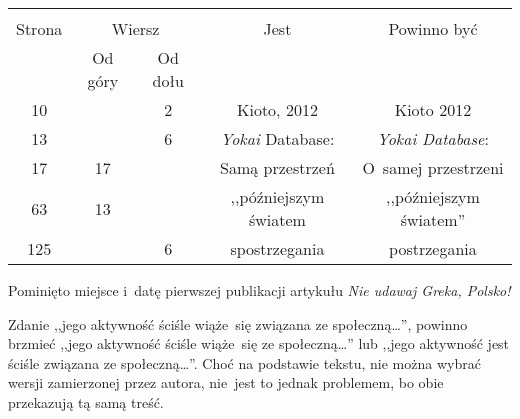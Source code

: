\documentclass[a4paper,11pt]{article}
\begin{document}
\begin{center}
  \begin{tabular}{|c|c|c|c|c|}
    \hline
    & \multicolumn{2}{c|}{} & & \\
    Strona & \multicolumn{2}{c|}{Wiersz} & Jest
                              & Powinno być \\ \cline{2-3}
    & Od góry & Od dołu & & \\
    \hline
    10  & &  2 & Kioto, 2012 & Kioto 2012 \\
    13  & &  6 & \emph{Yokai} Database: & \emph{Yokai Database}: \\
    17  & 17 & & Samą przestrzeń & O~samej przestrzeni \\
    63  & 13 & & ,,późniejszym światem & ,,późniejszym światem'' \\
    125 & &  6 & spostrzegania & postrzegania \\
    \hline
  \end{tabular}
\end{center}

\vspace{\spaceTwo}








\start {} Pominięto miejsce i~datę pierwszej publikacji
artykułu \emph{Nie udawaj Greka, Polsko!}

\vspace{\spaceTwo}








\start {} Zdanie ,,jego aktywność ściśle wiąże~się
związana ze społeczną\ldots'', powinno brzmieć ,,jego aktywność ściśle
wiąże~się ze społeczną\ldots'' lub ,,jego aktywność jest ściśle
związana ze społeczną\ldots''. Choć na podstawie tekstu, nie można
wybrać wersji zamierzonej przez autora, nie~jest to jednak problemem,
bo obie przekazują tą samą treść.
\end{document}
